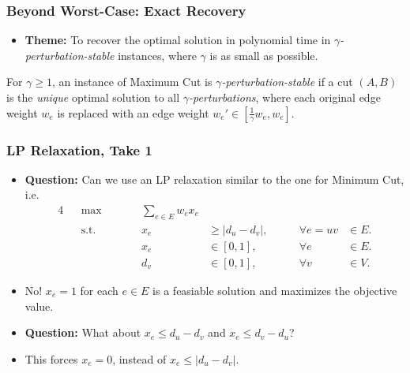 \documentclass{beamer}
\begin{document}
    \begin{frame}
        \frametitle{Beyond Worst-Case: Exact Recovery}
    
        \begin{itemize}
            \item {\bf Theme:} To recover the optimal solution in polynomial time in \emph{$\gamma$-perturbation-stable} instances, where $\gamma$ is as small as possible.
        \end{itemize}

        \pause

        \begin{definition}
            For $\gamma \geq 1$, an instance of {\sc Maximum Cut} is \emph{$\gamma$-perturbation-stable} if a cut $(A, B)$ is the \emph{unique} optimal solution to all \emph{$\gamma$-perturbations}, where each original edge weight $w_e$ is replaced with an edge weight $w_e' \in [\frac{1}{\gamma} w_e, w_e]$.
        \end{definition}
    \end{frame}

    \begin{frame}
        \frametitle{LP Relaxation, Take 1}
    
        \begin{itemize}
            \item {\bf Question:} Can we use an LP relaxation similar to the one for {\sc Minimum Cut}, i.e.
            \begin{alignat*}{4}
                && \max \qquad && \sum_{e \in E} w_e x_e \\
                && \text{s.t.} \qquad && x_e & \geq \left|d_u - d_v\right|, & \qquad \forall e = uv & \in E. \\
                && && x_e & \in [0, 1], & \qquad \forall e & \in E. \\
                && && d_v & \in [0, 1], & \qquad \forall v & \in V.
              \end{alignat*}
              \pause
              \vspace{-1em}
              \item No! $x_e = 1$ for each $e \in E$ is a feasiable solution and maximizes the objective value. \pause
              \item {\bf Question:} What about $x_e \leq d_u - d_v$ and $x_e \leq d_v - d_u$? \pause
              \item This forces $x_e = 0$, instead of $x_e \leq |d_u - d_v|$.
        \end{itemize}
    \end{frame}
\end{document}
